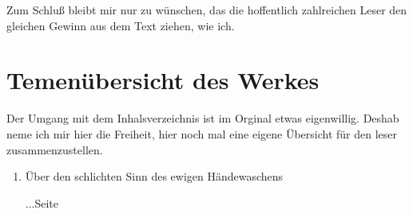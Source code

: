 Zum Schluß bleibt mir nur zu wünschen, das die hoffentlich zahlreichen Leser den gleichen Gewinn aus dem Text ziehen, wie ich.

\chapter{Temenübersicht des Werkes}

Der Umgang mit dem Inhalsverzeichnis ist im Orginal etwas eigenwillig. Deshab neme ich mir hier die Freiheit, hier noch mal eine eigene Übersicht für den leser zusammenzustellen.

\begin{enumerate}
 \item Über den schlichten Sinn des ewigen Händewaschens \begin{flushright} ...Seite \pageref{kap10_ende}\end{flushright}
\end{enumerate}

